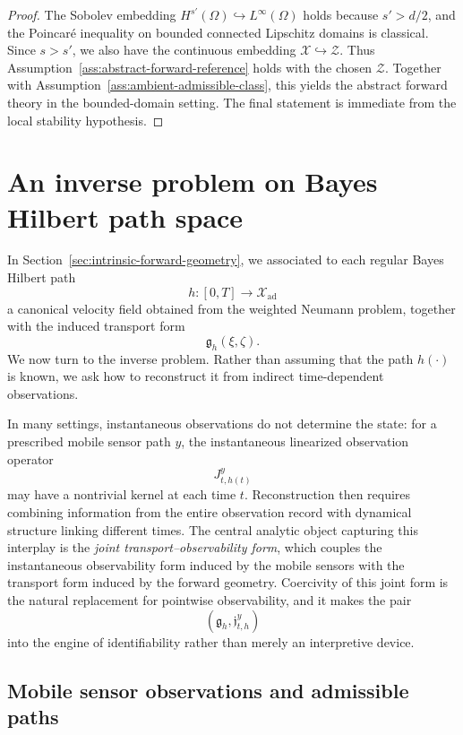 \documentclass{article}
\theoremstyle{definition}
\begin{document}
\begin{proof}
    The Sobolev embedding \(H^{s'}(\Omega)\hookrightarrow L^\infty(\Omega)\) holds because
    \(s'>d/2\), and the Poincar\'e inequality on bounded connected Lipschitz domains is
    classical. Since \(s>s'\), we also have the continuous embedding \(\mathcal X\hookrightarrow \mathcal Z\).
    Thus Assumption~\ref{ass:abstract-forward-reference} holds with the chosen \(\mathcal Z\).
    Together with Assumption~\ref{ass:ambient-admissible-class}, this yields the abstract forward
    theory in the bounded-domain setting. The final statement is immediate from the local
    stability hypothesis.
\end{proof}


\section{An inverse problem on Bayes Hilbert path space}
\label{sec:ambient-inverse-problem}

In Section~\ref{sec:intrinsic-forward-geometry}, we associated to each regular Bayes Hilbert path
\[
    h:[0,T]\to \mathcal X_{\mathrm{ad}}
\]
a canonical velocity field obtained from the weighted Neumann problem, together with the induced
transport form
\[
    \mathfrak g_h(\xi,\zeta).
\]
We now turn to the inverse problem. Rather than assuming that the path \(h(\cdot)\) is known, we
ask how to reconstruct it from indirect time-dependent observations.

In many settings, instantaneous observations do not determine the state: for a prescribed mobile
sensor path \(y\), the instantaneous linearized observation operator
\[
    J_{t,h(t)}^{y}
\]
may have a nontrivial kernel at each time \(t\). Reconstruction then requires combining information
from the entire observation record with dynamical structure linking different times. The central
analytic object capturing this interplay is the \emph{joint transport--observability form}, which
couples the instantaneous observability form induced by the mobile sensors with the transport form
induced by the forward geometry. Coercivity of this joint form is the natural replacement for
pointwise observability, and it makes the pair
\[
    (\mathfrak g_h,\mathfrak j_{t,h}^{y})
\]
into the engine of identifiability rather than merely an interpretive device.

\subsection{Mobile sensor observations and admissible paths}
\label{subsec:mobile-sensor-observations}
\end{document}
